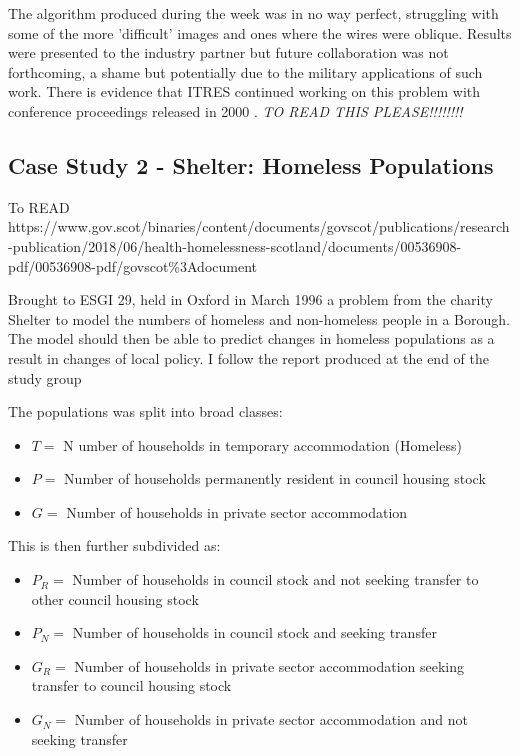 \documentclass[11pt]{article} %
\begin{document}
	The algorithm produced during the week was in no way perfect, struggling with some of the more 'difficult' images and ones where the wires were oblique. Results were presented to the industry partner but future collaboration was not forthcoming, a shame but potentially due to the military applications of such work. There is evidence that ITRES continued working on this problem with conference proceedings released in 2000 \cite{Babey}. \emph{TO READ THIS PLEASE!!!!!!!!}
	

	
	
	\subsection{Case Study 2 - Shelter: Homeless Populations}
	
To READ https://www.gov.scot/binaries/content/documents/govscot/publications/research-publication/2018/06/health-homelessness-scotland/documents/00536908-pdf/00536908-pdf/govscot\%3Adocument
	
   Brought to ESGI 29, held in Oxford in March 1996 a problem from the charity Shelter to model the numbers of homeless and non-homeless people in a Borough. The model should then be able to predict changes in homeless populations as a result in changes of local policy. I follow the report produced at the end of the study group \cite{Shelter1996}
	
	The populations was split into broad classes: 
	\begin{itemize}
		\item $ T= $ N umber of households in temporary accommodation (Homeless)
		\item $  P= $ Number of households permanently resident in council housing stock
		\item $ G= $ Number of households in private sector accommodation 
	\end{itemize}
	This is then further subdivided as:
	\begin{itemize}
		\item $ P_R= $ Number of households in council stock and not  seeking transfer to other council housing stock 
		\item $ P_N= $ Number of households in council stock and seeking transfer 
		\item $ G_R= $ Number of households in private sector accommodation seeking transfer to council housing stock 
		\item $ G_N= $ Number of households in private sector accommodation and not seeking transfer
	\end{itemize}
\end{document}
